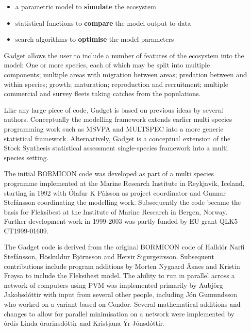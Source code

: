 \documentclass[10pt,twoside]{book}
\begin{document}
\begin{itemize}
\item a parametric model to {\bf simulate} the ecosystem
\item statistical functions to {\bf compare} the model output to data
\item search algorithms to {\bf optimise} the model parameters
\end{itemize}

Gadget allows the user to include a number of features of the ecosystem into the model: One or more species, each of which may be split into multiple components; multiple areas with migration between areas; predation between and within species; growth; maturation; reproduction and recruitment; multiple commercial and survey fleets taking catches from the populations.

\bigskip
Like any large piece of code, Gadget is based on previous ideas by several authors.  Conceptually the modelling framework extends earlier multi species programming work such as MSVPA and MULTSPEC into a more generic statistical framework.  Alternatively, Gadget is a conceptual extension of the Stock Synthesis statistical assessment single-species framework into a multi species setting.

\bigskip
The initial BORMICON code was developed as part of a multi species programme implemented at the Marine Research Institute in Reykjavik, Iceland, starting in 1992 with \'{O}lafur K P\'{a}lsson as project coordinator and Gunnar Stef\'{a}nsson coordinating the modelling work.  Subsequently the code became the basis for Fleksibest at the Institute of Marine Research in Bergen, Norway.  Further development work in 1999-2003 was partly funded by EU grant QLK5-CT1999-01609.

\bigskip
The Gadget code is derived from the original BORMICON code of Halld\'{o}r Narfi Stef\'{a}nsson, H\"{o}skuldur Bj\"{o}rnsson and Hersir Sigurgeirsson.  Subsequent contributions include program additions by Morten Nygaard {\AA}snes and Kristin Fr{\o}ysa to include the Fleksibest model.  The ability to run in parallel across a network of computers using PVM was implemented primarily by Au{\dh}bj\"{o}rg Jakobsd\'{o}ttir with input from several other people, including J\'{o}n Gu{\dh}mundsson who worked on a variant based on Condor.  Several mathematical additions and changes to allow for parallel minimisation on a network were implemented by {\TH}\'{o}rd\'{i}s Linda {\TH}\'{o}rarinsd\'{o}ttir and Kristjana \'{Y}r J\'{o}nsd\'{o}ttir.
\end{document}
